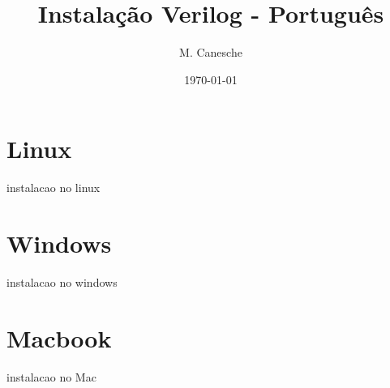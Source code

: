 \documentclass{article}
\title{Instalação Verilog - Português}
\date{\today}
\author{M. Canesche}
\begin{document}
		\maketitle
	
		\section{Linux}
			
			instalacao no linux	
			
		\section{Windows}
		
			instalacao no windows
			
		\section{Macbook}
		
			instalacao no Mac
	
	
\end{document}
